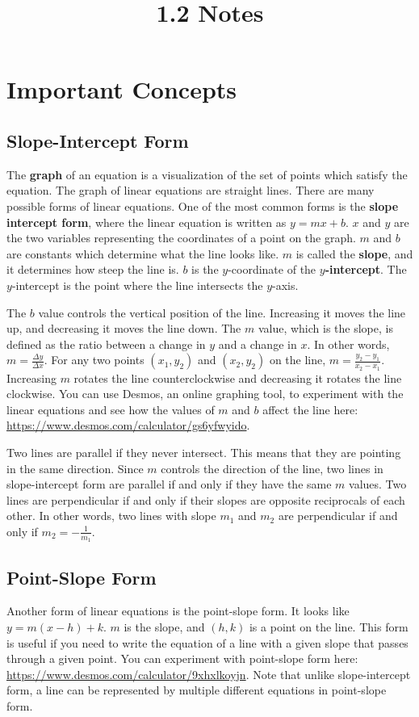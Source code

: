 \documentclass{article}
\title{1.2 Notes}
\author{}
\date{}
\begin{document}
    \maketitle
    \section*{Important Concepts}
    \subsection*{Slope-Intercept Form}
    The \textbf{graph} of an equation is a visualization of the set of points
    which satisfy the equation. The graph of linear equations are straight
    lines. There are many possible forms of linear equations. One of the most
    common forms is the \textbf{slope intercept form}, where the linear equation
    is written as $y = mx + b$. $x$ and $y$ are the two variables representing
    the coordinates of a point on the graph. $m$ and $b$ are constants which
    determine what the line looks like. $m$ is called the \textbf{slope}, and it
    determines how steep the line is. $b$ is the $y$-coordinate of the
    \textbf{$y$-intercept}. The $y$-intercept is the point where the line
    intersects the $y$-axis.

    The $b$ value controls the vertical position of the line. Increasing it
    moves the line up, and decreasing it moves the line down. The $m$ value,
    which is the slope, is defined as the ratio between a change in $y$ and a
    change in $x$. In other words, $m = \frac{\Delta y}{\Delta x}$. For any two
    points $(x_1, y_2)$ and $(x_2, y_2)$ on the line, $m = \frac{y_2 - y_1}{x_2
    - x_1}$. Increasing $m$ rotates the line counterclockwise and decreasing it
    rotates the line clockwise. You can use Desmos, an online graphing tool, to
    experiment with the linear equations and see how the values of $m$ and $b$
    affect the line here: \url{https://www.desmos.com/calculator/gs6yfwyido}.

    Two lines are parallel if they never intersect. This means that they are
    pointing in the same direction. Since $m$ controls the direction of the
    line, two lines in slope-intercept form are parallel if and only if they
    have the same $m$ values. Two lines are perpendicular if and only if their
    slopes are opposite reciprocals of each other. In other words, two lines
    with slope $m_1$ and $m_2$ are perpendicular if and only if $m_2 =
    -\frac{1}{m_1}$.
    \subsection*{Point-Slope Form}
    Another form of linear equations is the point-slope form. It looks like $y =
    m(x - h) + k$. $m$ is the slope, and $(h, k)$ is a point on the line. This
    form is useful if you need to write the equation of a line with a given
    slope that passes through a given point. You can experiment with point-slope
    form here: \url{https://www.desmos.com/calculator/9xhxlkoyjn}. Note that
    unlike slope-intercept form, a line can be represented by multiple different
    equations in point-slope form.
\end{document}
